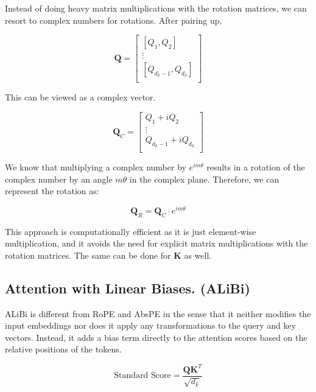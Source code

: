 \documentclass[10pt]{article}
\theoremstyle{plain}
\begin{document}
\begin{remark}
    Instead of doing heavy matrix multiplications with the rotation matrices, we can resort to complex numbers for rotations. After pairing up, 

    \[
        \mathbf{Q} = \begin{bmatrix}
            [Q_1 , Q_2]  \\
             \vdots   \\
            [Q_{d_k - 1},  Q_{d_k}]  \\
        \end{bmatrix}
    \]

    This can be viewed as a complex vector. 

    \[
        \mathbf{Q}_C = \begin{bmatrix}
            Q_1 + i Q_2  \\
             \vdots   \\
            Q_{d_k - 1} + i Q_{d_k}  \\
        \end{bmatrix}
    \]
    
    We know that multiplying a complex number by \(e^{i m\theta}\) results in a rotation of the complex number by an angle \(m\theta\) in the complex plane. Therefore, we can represent the rotation as:

    \[
        \mathbf{Q}_R = \mathbf{Q}_C \cdot e^{i m\theta}
    \]

    This approach is computationally efficient as it is just element-wise multiplication, and it avoids the need for explicit matrix multiplications with the rotation matrices. The same can be done for \(\mathbf{K}\) as well.
\end{remark}

\vspace{0.1in}

\subsection{Attention with Linear Biases. (ALiBi)}

ALiBi is different from RoPE and AbsPE in the sense that it neither modifies the input embeddings nor does it apply any transformations to the query and key vectors. Instead, it adds a bias term directly to the attention scores based on the relative positions of the tokens. 

\[
    \text{Standard Score} = \frac{\mathbf{Q} \mathbf{K}^T}{\sqrt{d_k}}
\]
\end{document}
